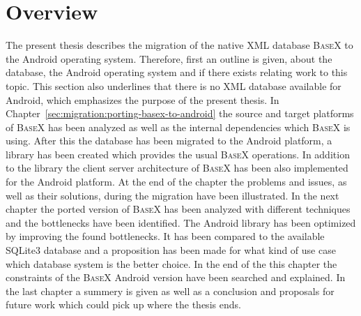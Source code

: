 \section{Overview}
\label{sec:overview}
The present thesis describes the migration of the native XML database \textsc{BaseX} to the Android operating system.
Therefore, first an outline is given, about the database, the Android operating system and if there exists relating work to this topic.
This section also underlines that there is no XML database available for Android, which emphasizes the purpose of the present thesis.
In Chapter~\ref{sec:migration:porting-basex-to-android} the source and target platforms of \textsc{BaseX} has been analyzed as well as the internal dependencies which \textsc{BaseX} is using.
After this the database has been migrated to the Android platform, a library has been created which provides the usual \textsc{BaseX} operations.
In addition to the library the client server architecture of \textsc{BaseX} has been also implemented for the Android platform.
At the end of the chapter the problems and issues, as well as their solutions, during the migration have been illustrated.
In the next chapter the ported version of \textsc{BaseX} has been analyzed with different techniques and the bottlenecks have been identified.
The Android library has been optimized by improving the found bottlenecks.
It has been compared to the available SQLite3 database and a proposition has been made for what kind of use case which database system is the better choice.
In the end of the this chapter the constraints of the \textsc{BaseX} Android version have been searched and explained.
In the last chapter a summery is given as well as a conclusion and proposals for future work which could pick up where the thesis ends.


